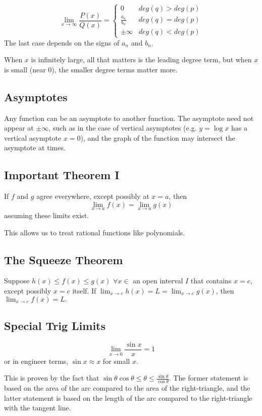 \documentclass{article}
\begin{document}
$$\lim_{x\to\infty}\frac{P(x)}{Q(x)} = \begin{cases}
    0 & deg(q) > deg(p) \\
    \frac{a_n}{b_n} & deg(q) = deg(p)\\
    \pm \infty & deg(q) < deg(p)
\end{cases}$$
The last case depends on the signs of $a_n$ and $b_n$.

When $x$ is infinitely large, all that matters is the leading degree term, but when $x$ is small (near $0$), the smaller degree terms matter more.

\subsection{Asymptotes}
Any function can be an asymptote to another function. The asymptote need not appear at $\pm\infty$, such as in the case of vertical asymptotes (e.g. $y=\log{x}$ has a vertical asymptote $x=0$), and the graph of the function may intersect the asymptote at times.

\subsection{Important Theorem I}
If $f$ and $g$ agree everywhere, except possibly at $x=a$, then \[ \lim_{x \to a} f(x) = \lim_{x \to a} g(x) \] assuming these limits exist.

This allows us to treat rational functions like polynomials.

\subsection{The Squeeze Theorem}
Suppose $h(x) \le f(x) \le g(x)$ $\forall x \in$ an open interval $I$ that contains $x=c$, except possibly $x=c$ itself. If $\lim_{x\to c}\limits h(x) = L = \lim_{x\to c}\limits g(x)$, then $\lim_{x \to c}f(x) = L.$

\subsection{Special Trig Limits}\label{trig-limits}
$$\lim_{x\to 0} \frac{\sin{x}}{x} = 1$$ or in engineer terms, $\sin{x} \approx x$ for small $x$.

This is proven by the fact that $\sin{\theta}\cos{\theta} \le \theta \le \frac{\sin{\theta}}{\cos{\theta}}$. The former statement is based on the area of the arc compared to the area of the right-triangle, and the latter statement is based on the length of the arc compared to the right-triangle with the tangent line.
\end{document}
